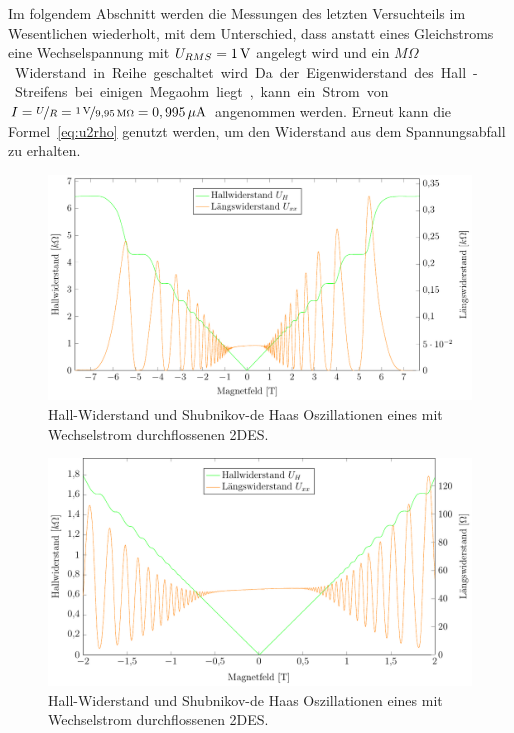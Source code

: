
Im folgendem Abschnitt werden die Messungen des letzten Versuchteils im Wesentlichen wiederholt, mit dem Unterschied, dass anstatt eines Gleichstroms eine Wechselspannung %
 mit $U_{RMS}=\unit[1]{V}$ angelegt wird und ein \unit[9,95]{$M\Omega$} Widerstand in Reihe geschaltet wird. Da der Eigenwiderstand des Hall-Streifens bei einigen Megaohm liegt, kann ein Strom von $I=\nicefrac{U}{R}=\nicefrac{\unit[1]{V}}{\unit[9,95]{M\Omega}}=\unit[0,995]{\mu A}$ angenommen werden. Erneut kann die Formel~\eqref{eq:u2rho} genutzt werden, um den Widerstand aus dem Spannungsabfall zu erhalten.



\begin{figure}[h]
	\centering
	\includegraphics{graphs/ac/full_range.pdf}
	\caption[Wechselstrommessung im maximalen Magnetfeldbereich]{
		Hall-Widerstand und Shubnikov-de Haas Oszillationen eines mit Wechselstrom durchflossenen 2DES.
	}
	\label{fig:full_range_ac}
\end{figure}

\begin{figure}[h]
	\centering
	\includegraphics{graphs/ac/pm2T_range.pdf}
	\caption[Höher aufgelöste Wechselstrommessung in Magnetfeldteilbereich]{
		Hall-Widerstand und Shubnikov-de Haas Oszillationen eines mit Wechselstrom durchflossenen 2DES.
	}
	\label{fig:2T_range_ac}
\end{figure}